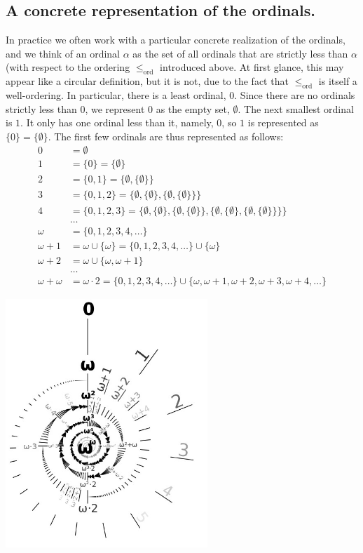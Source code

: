 \documentclass[a4paper]{memoir}
\theoremstyle{definition}
\begin{document}
\subsection{A concrete representation of the ordinals.}

In practice we often work with a particular concrete realization of the ordinals, and we 
think of an ordinal $\alpha$ as the set of all ordinals that are strictly less than $\alpha$ 
(with respect to the ordering $\leq_{\mathrm{ord}}$ introduced above. At first glance, this 
may appear like a circular definition, but it is not, due to the fact that $\leq_{\mathrm{ord}}$ 
is itself a well-ordering. In particular, there is a least ordinal, $0$. Since there are no ordinals 
strictly less than $0$, we represent $0$ as the empty set, $\emptyset$. The next smallest ordinal 
is $1$. It only has one ordinal less than it, namely, $0$, so $1$ is represented as 
$\{0\} = \{\emptyset\}$. The first few ordinals are thus represented as follows:
\begin{align*}
  0 &= \emptyset \\
  1 &= \{0\} = \{\emptyset\} \\ 
  2 &= \{0,1\} = \{\emptyset, \{\emptyset\}\} \\ 
  3 &= \{0,1,2\} = \{\emptyset, \{\emptyset\}, \{\emptyset, \{\emptyset\}\}\} \\ 
  4 &= \{0,1,2,3\} = \{\emptyset, \{\emptyset\}, \{\emptyset, \{\emptyset\}\}, 
  \{\emptyset, \{\emptyset\}, \{\emptyset, \{\emptyset\}\}\}\} \\ 
  &\ldots \\ 
  \omega &= \{0,1,2,3,4, \ldots\} \\ 
  \omega + 1 &= \omega \cup \{\omega\} = \{0,1,2,3,4, \ldots\} \cup \{\omega\} \\ 
  \omega + 2 &= \omega \cup \{\omega, \omega + 1\} \\ 
  &\ldots \\ 
  \omega + \omega &= \omega \cdot 2 = \{0,1,2,3,4, \ldots\} \cup \{\omega, \omega + 1, \omega + 2, 
  \omega + 3, \omega + 4, \ldots\}
\end{align*}

\begin{center}
  \includegraphics[width=3in]{omega_to_omega}
\end{center}
\end{document}
